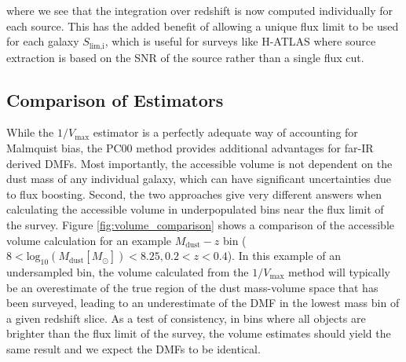 \noindent where we see that the integration over redshift is now computed individually for each source. This has the added benefit of allowing a unique flux limit to be used for each galaxy $S_{\textrm{lim,i}}$, which is useful for surveys like H-ATLAS where source extraction is based on the SNR of the source rather than a single flux cut.

\subsection{Comparison of Estimators}

While the $1/V_{\textrm{max}}$ estimator is a perfectly adequate way of accounting for Malmquist bias, the PC00 method provides additional advantages for far-IR derived DMFs. Most importantly, the accessible volume is not dependent on the dust mass of any individual galaxy, which can have significant uncertainties due to flux boosting. Second, the two approaches give very different answers when calculating the accessible volume in underpopulated bins near the flux limit of the survey. Figure \ref{fig:volume_comparison} shows a comparison of the accessible volume calculation for an example $M_{\textrm{dust}} - z$ bin ($8 < \textrm{log}_{10}(M_\textrm{dust} [M_\odot]) < 8.25, 0.2 < z < 0.4$). In this example of an undersampled bin, the volume calculated from the $1/V_{\textrm{max}}$ method will typically be an overestimate of the true region of the dust mass-volume space that has been surveyed, leading to an underestimate of the DMF in the lowest mass bin of a given redshift slice. As a test of consistency, in bins where all objects are brighter than the flux limit of the survey, the volume estimates should yield the same result and we expect the DMFs to be identical.

